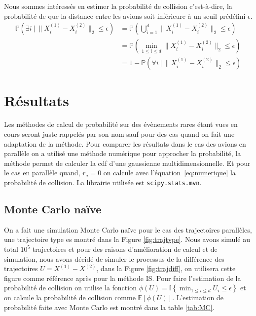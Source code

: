 \documentclass[a4paper, 12pt,twoside]{article}
\numberwithin{equation}{subsection}
\begin{document}
	Nous sommes intéressés en estimer la probabilité de collision c'est-à-dire, la probabilité de que la distance entre les avions soit inférieure à un seuil prédéfini $\epsilon$.
	\begin{subequations}
	\begin{align}
		\mathbb{P}\left(\exists i~|~ \lVert X^{(1)}_{i} - X^{(2)}_{i} \rVert_2 \leq \epsilon \right)
		&= \mathbb{P}\left(\bigcup_{i=1}^{d} \lVert X^{(1)}_{i} - X^{(2)}_{i} \rVert_2 \leq \epsilon  \right)  \\
		&= \mathbb{P}\left(\min_{1\leq i\leq d} \lVert X^{(1)}_{i} - X^{(2)}_{i} \rVert_2 \leq \epsilon \right)  \\
		&= 1-\mathbb{P}\left(\forall i~|~ \lVert X^{(1)}_{i} - X^{(2)}_{i} \rVert_2 \leq \epsilon \right) \label{eq:numerique}
	\end{align}
	\end{subequations}
	
	
	
    \clearpage
    
    \section{Résultats}
	Les méthodes de calcul de probabilité sur des évènements rares étant vues en cours seront juste rappelés par son nom sauf pour des cas quand on fait une adaptation de la méthode. Pour comparer les résultats dans le cas des avions en parallèle on a utilisé une méthode numérique pour approcher la probabilité, la méthode permet de calculer la cdf d'une gaussienne multidimensionnelle. Et pour le cas en parallèle quand, $r_a=0$ on calcule avec l'équation~\ref{eq:numerique} la probabilité de collision. La librairie utilisée est {\tt scipy.stats.mvn}.
	
	\subsection{Monte Carlo naïve} %
	\label{sub:monte_carlo_naive}
	On a fait une simulation Monte Carlo naïve pour le cas des trajectoires parallèles, une trajectoire type es montré dans la Figure \ref{fig:trajtype}. Nous avons simulé au total $10^5$ trajectoires et pour des raisons d'amélioration de calcul et de simulation, nous avons décidé de simuler le processus de la différence des trajectoires $U=X^{(1)} - X^{(2)}$, dans la Figure \ref{fig:trajdiff}, on utilisera cette figure comme référence après pour la méthode IS. Pour faire l'estimation de la probabilité de collision on utilise la fonction $\phi(U)=\mathbb{I}\left \{\min_{1\leq i \leq d} U_i \leq \epsilon \right \}$ et on calcule la probabilité de collision comme $\mathbb{E}[\phi(U)]$. L'estimation de probabilité faite avec Monte Carlo est montré dans la table \ref{tab:MC}.
	
\end{document}
